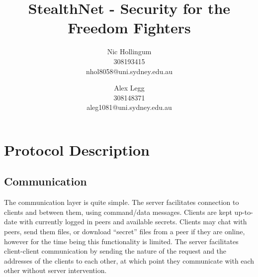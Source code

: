 
\author{
		Nic Hollingum\\
		308193415\\
		nhol8058@uni.sydney.edu.au
	\and
		Alex Legg\\
		308148371\\
		aleg1081@uni.sydney.edu.au
}
\title{StealthNet - Security for the Freedom Fighters}

\addtolength{\oddsidemargin}{-.875in}
\addtolength{\evensidemargin}{-.875in}
\addtolength{\textwidth}{1.75in}
\addtolength{\topmargin}{-1.375in}
\setlength{\topskip}{0mm}
\addtolength{\textheight}{3.5in}
\setlength{\parskip}{0mm}
\setlength{\itemsep}{0mm}


\maketitle

\section {Protocol Description}
\subsection{Communication}
The communication layer is quite simple.  The server facilitates connection to clients and between them, using command/data messages.
Clients are kept up-to-date with currently logged in peers and available secrets.
Clients may chat with peers, send them files, or download ``secret'' files from a peer if they are online, however for the time being this functionality is limited.
The server facilitates client-client communication by sending the nature of the request and the addresses of the clients to each other, at which point they communicate with each other without server intervention.

